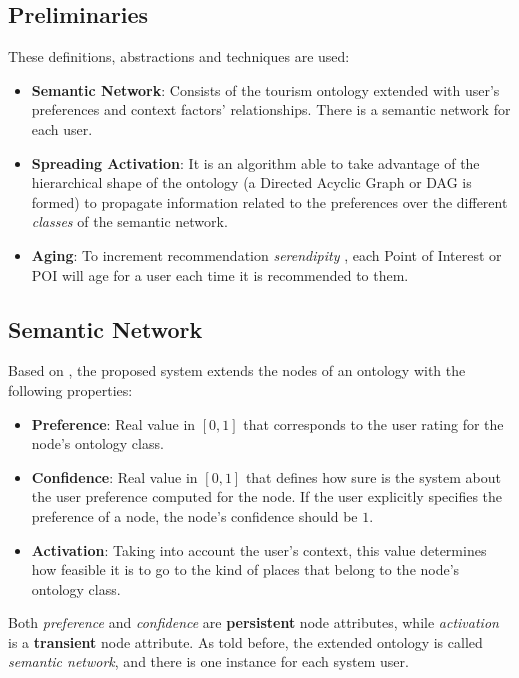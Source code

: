 \subsection{Preliminaries}
These definitions, abstractions and techniques are used:
\begin{itemize}
\item \textbf{Semantic Network}: Consists of the tourism ontology extended with user's preferences and context factors' relationships. There is a semantic network for each user.
\item \textbf{Spreading Activation}: It is an algorithm able to take advantage of the hierarchical shape of the ontology (a Directed Acyclic Graph or DAG is formed) to propagate information related to the preferences over the different \textit{classes} of the semantic network.
\item \textbf{Aging}: To increment recommendation \textit{serendipity} \cite{kotkov2016survey}, each Point of Interest or POI will age for a user each time it is recommended to them.
\end{itemize}

\subsection{Semantic Network} \label{section:semantic_network}

Based on \cite{bahramian_abbaspour_claramunt_2017}, the proposed system extends the nodes of an ontology with the following properties:
\begin{itemize}
    \item \textbf{Preference}: Real value in $[0, 1]$ that corresponds to the user rating for the node's ontology class.
    \item \textbf{Confidence}: Real value in $[0, 1]$ that defines how sure is the system about the user preference computed for the node. If the user explicitly specifies the preference of a node, the node's confidence should be $1$.
    \item \textbf{Activation}: Taking into account the user's context, this value determines how feasible it is to go to the kind of places that belong to the node's ontology class.
\end{itemize}{}
Both \textit{preference} and \textit{confidence} are \textbf{persistent} node attributes, while \textit{activation} is a \textbf{transient} node attribute. As told before, the extended ontology is called \textit{semantic network}, and there is one instance for each system user.
 
